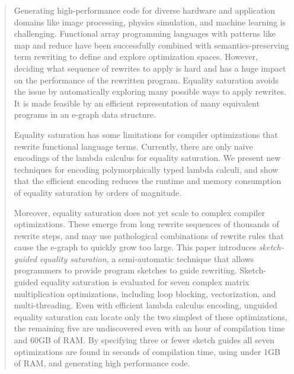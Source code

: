 \documentclass[acmsmall,nonacm]{acmart}\settopmatter{printfolios=true,printccs=false,printacmref=false}
\begin{document}
\begin{abstract}

Generating high-performance code for diverse hardware and application domains like image processing, physics simulation, and machine learning is challenging.
Functional array programming languages with patterns like map and reduce have been successfully combined with semantics-preserving term rewriting to define and explore optimization spaces.
However, deciding what sequence of rewrites to apply is hard and has a huge impact on the performance of the rewritten program. 
Equality saturation avoids the issue by automatically exploring many possible ways to apply rewrites.
It is made feasible by an efficient representation of many equivalent programs in an e-graph data structure.

Equality saturation has some limitations for compiler optimizations that rewrite functional language terms.
Currently, there are only naive encodings of the lambda calculus for equality saturation.
We present new techniques for encoding polymorphically typed lambda calculi, and show that the efficient encoding reduces the runtime and memory consumption of equality saturation by orders of magnitude.

Moreover, equality saturation does not yet scale to complex compiler optimizations.
These emerge from long rewrite sequences of thousands of rewrite steps, and may use pathological combinations of rewrite rules that cause the e-graph to quickly grow too large. This paper introduces \emph{sketch-guided equality saturation}, a semi-automatic technique that allows programmers to provide program sketches to guide rewriting.
Sketch-guided equality saturation is evaluated for seven complex matrix multiplication optimizations, including loop blocking, vectorization, and multi-threading.
Even with efficient lambda calculus encoding, unguided equality saturation can locate only the two simplest of these optimizations, the remaining five are undiscovered even with an hour of compilation time and 60GB of RAM.
By specifying three or fewer sketch guides all seven optimizations are found in seconds of compilation time, using under 1GB of RAM, and generating high performance code.

\end{abstract}
\end{document}
